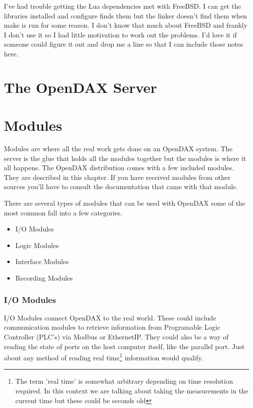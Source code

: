 \documentclass[letterpaper,10pt]{book}
\begin{document}
I've had trouble getting the Lua dependencies met with FreeBSD. I can get the libraries installed and configure finds them but the linker doesn't find them when make is run for some reason. I don't know that much about FreeBSD and frankly I don't use it so I had little motivation to work out the problems. I'd love it if someone could figure it out and drop me a line so that I can include those notes here. 

\chapter*{The OpenDAX Server}


\chapter*{Modules}
Modules are where all the real work gets done on an OpenDAX system.  The server is the glue that holds all the modules together but the modules is where it all happens.  The OpenDAX distribution comes with a few included modules.  They are described in this chapter.  If you have received modules from other sources you'll have to consult the documentation that came with that module.

There are several types of modules that can be used with OpenDAX some of the most common fall into a few categories.

\begin{itemize}
\item I/O Modules
\item Logic Modules
\item Interface Modules
\item Recording Modules
\end{itemize}

\subsection*{I/O Modules}
I/O Modules connect OpenDAX to the real world. These could include communication modules to retrieve information from Programable Logic Controller (PLC's) via Modbus or EthernetIP.  They could also be a way of reading the state of ports on the host computer itself, like the parallel port.  Just about any method of reading real time\footnote{The term 'real time' is somewhat arbitrary depending on time resolution required.  In this context we are talking about taking the measurements in the current time but these could be seconds old} information would qualify.
\end{document}
